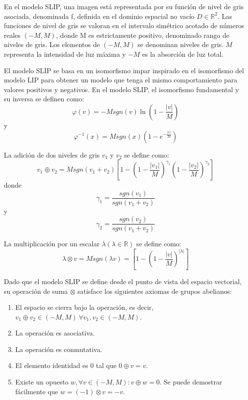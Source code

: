En el modelo SLIP, una imagen está representada por su función de nivel de gris asociada, denominada f, definida en el dominio espacial no vacío $D \in \mathbb{R}^2$. Las funciones de nivel de gris se valoran en el intervalo simétrico acotado de números reales $(-M, M)$, donde M es estrictamente positivo, denominado rango de niveles de gris. Los elementos de $(-M, M )$ se denominan niveles de gris. $M$ representa la intensidad de luz máxima y $-M$ es la absorción de luz total.

El modelo SLIP se basa en un isomorfismo impar inspirado en el isomorfismo del modelo LIP para obtener un modelo que tenga el mismo comportamiento para valores positivos y negativos. En el modelo SLIP, el isomorfismo fundamental y su inversa se definen como:
\begin{equation}
	\varphi(v)=-Msgn(v)\ln\left(1-\frac{|v|}{M}\right)
\end{equation}
y
\begin{equation}
	\varphi^{-1}(x)=Msgn(x)\left(1-e^{-\frac{|x|}{M}}\right)
\end{equation}

La adición de dos niveles de gris $v_1$ y $v_2$ se define como:
\begin{equation}
	v_1\oplus v_2=Msgn(v_1+v_2)\left[1-\left(1-\frac{|v_1|}{M}\right)^{\gamma_1}\left(1-\frac{|v_2|}{M}\right)^{\gamma_2}\right]
\end{equation}
donde
\begin{equation}
	\gamma_1=\frac{sgn(v_1)}{sgn(v_1+v_2)}
\end{equation}
y
\begin{equation}
	\gamma_2=\frac{sgn(v_2)}{sgn(v_1+v_2)}
\end{equation}

La multiplicación por un escalar $\lambda (\lambda \in \mathbb{R})$ se define como:
\begin{equation}
	\lambda \otimes v = Msgn(\lambda v)=\left[1-\left(1-\frac{|v|}{M}\right)^{|\lambda|}\right]
\end{equation}

Dado que el modelo SLIP se define desde el punto de vista del espacio vectorial, su operación de suma $\otimes$ satisface los siguientes axiomas de grupos abelianos:

\begin{enumerate}
	\item El espacio se cierra bajo la operación, es decir, $v_1\oplus v_2 \in (-M, M )~\forall v_1, v_2 \in (-M, M )$.
	\item La operación es asociativa.
	\item La operación es conmutativa.
	\item El elemento identidad es $0$ tal que $0\oplus v = v$.
	\item  Existe un opuesto $w, \forall v \in (-M, M ): v \oplus w = 0$.  Se puede demostrar fácilmente que $w = (-1)\otimes v = -v$.
\end{enumerate}
  
